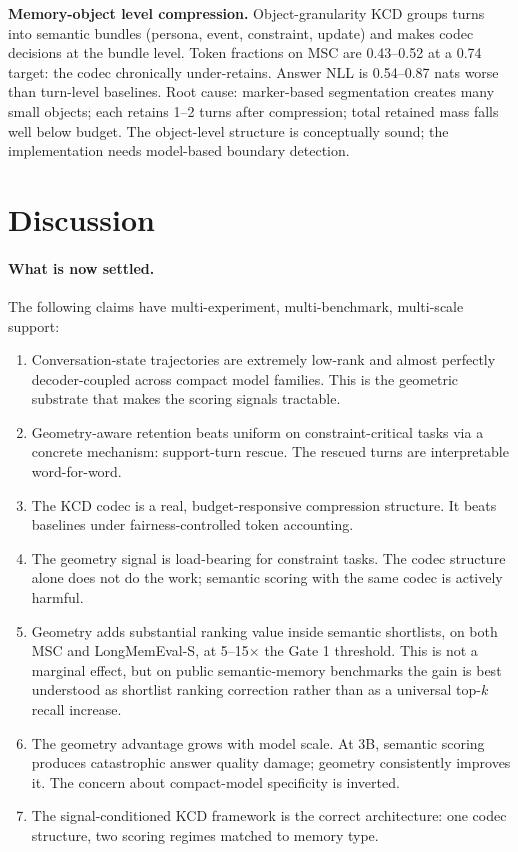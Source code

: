 \documentclass[conference]{IEEEtran}
\begin{document}
\textbf{Memory-object level compression.}
Object-granularity KCD groups turns into semantic bundles (persona, event,
constraint, update) and makes codec decisions at the bundle level.
Token fractions on MSC are 0.43--0.52 at a 0.74 target: the codec chronically
under-retains. Answer NLL is 0.54--0.87 nats worse than turn-level baselines.
Root cause: marker-based segmentation creates many small objects; each retains
1--2 turns after compression; total retained mass falls well below budget. The
object-level structure is conceptually sound; the implementation needs
model-based boundary detection.

\section{Discussion}
\label{sec:discussion}

\paragraph{What is now settled.}
The following claims have multi-experiment, multi-benchmark, multi-scale
support:
\begin{enumerate}[leftmargin=1.4em]
\item Conversation-state trajectories are extremely low-rank and almost
  perfectly decoder-coupled across compact model families. This is the
  geometric substrate that makes the scoring signals tractable.
\item Geometry-aware retention beats uniform on constraint-critical tasks via
  a concrete mechanism: support-turn rescue. The rescued turns are
  interpretable word-for-word.
\item The KCD codec is a real, budget-responsive compression structure. It
  beats baselines under fairness-controlled token accounting.
\item The geometry signal is load-bearing for constraint tasks. The codec
  structure alone does not do the work; semantic scoring with the same codec
  is actively harmful.
\item Geometry adds substantial ranking value inside semantic shortlists, on
  both MSC and LongMemEval-S, at 5--15$\times$ the Gate 1 threshold. This is
  not a marginal effect, but on public semantic-memory benchmarks the gain is
  best understood as shortlist ranking correction rather than as a universal
  top-$k$ recall increase.
\item The geometry advantage grows with model scale. At 3B, semantic scoring
  produces catastrophic answer quality damage; geometry consistently improves
  it. The concern about compact-model specificity is inverted.
\item The signal-conditioned KCD framework is the correct architecture: one
  codec structure, two scoring regimes matched to memory type.
\end{enumerate}
\end{document}
